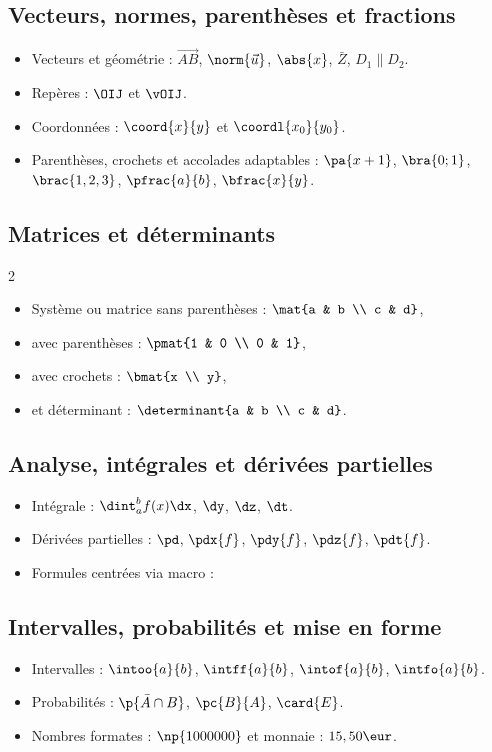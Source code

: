 \documentclass{poly}
\begin{document}
\subsection{Vecteurs, normes, parenthèses et fractions}
\begin{itemize}
	\item Vecteurs et géométrie : $\vec{AB}$, $\norm{\vec{u}}$, $\abs{x}$, $\bar{Z}$, $D_1 \parallel D_2$.
	\item Repères : $\OIJ$ et $\vOIJ$.
	\item Coordonnées : $\coord{x}{y}$ et $\coordl{x_0}{y_0}$.
	\item Parenthèses, crochets et accolades adaptables : $\pa{x+1}$, $\bra{0 ; 1}$, $\brac{1, 2, 3}$, $\pfrac{a}{b}$, $\bfrac{x}{y}$.
\end{itemize}

\subsection{Matrices et déterminants}
\begin{multicols}{2}
	\begin{itemize}
		\item Système ou matrice sans parenthèses : $\mat{a & b \\ c & d}$,
		\item avec parenthèses : $\pmat{1 & 0 \\ 0 & 1}$,
		\item avec crochets : $\bmat{x \\ y}$,
		\item et déterminant : $\determinant{a & b \\ c & d}$.
	\end{itemize}
\end{multicols}

\subsection{Analyse, intégrales et dérivées partielles}
\begin{itemize}
	\item Intégrale : $\dint_{a}^{b} f(x) \dx$, $\dy$, $\dz$, $\dt$.
	\item Dérivées partielles : $\pd$, $\pdx{f}$, $\pdy{f}$, $\pdz{f}$, $\pdt{f}$.
	\item Formules centrées via macro : 
\end{itemize}

\subsection{Intervalles, probabilités et mise en forme}
\begin{itemize}
	\item Intervalles : $\intoo{a}{b}$, $\intff{a}{b}$, $\intof{a}{b}$, $\intfo{a}{b}$.
	\item Probabilités : $\p{\bar{A}\cap B}$, $\pc{B}{A}$, $\card{E}$.
	\item Nombres formates : $\np{1000000}$ et monnaie : $15,50 \eur$.
\end{itemize}
\end{document}
